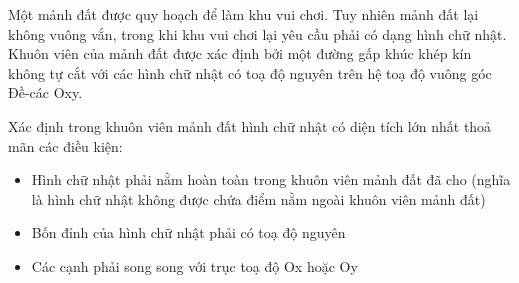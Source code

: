 Một mảnh đất được quy hoạch để làm khu vui chơi. Tuy nhiên mảnh đất lại không vuông vắn, trong khi khu vui chơi lại yêu cầu phải có dạng hình chữ nhật. Khuôn viên của mảnh đất được xác định bởi một đường gấp khúc khép kín không tự cắt với các hình chữ nhật có toạ độ nguyên trên hệ toạ độ vuông góc Đề-các Oxy.

Xác định trong khuôn viên mảnh đất hình chữ nhật có diện tích lớn nhất thoả mãn các điều kiện:
\begin{itemize}
	\item Hình chữ nhật phải nằm hoàn toàn trong khuôn viên mảnh đất đã cho (nghĩa là hình chữ nhật không được chứa điểm nằm ngoài khuôn viên mảnh đất)
	\item Bốn đỉnh của hình chữ nhật phải có toạ độ nguyên
	\item Các cạnh phải song song với trục toạ độ Ox hoặc Oy
\end{itemize}